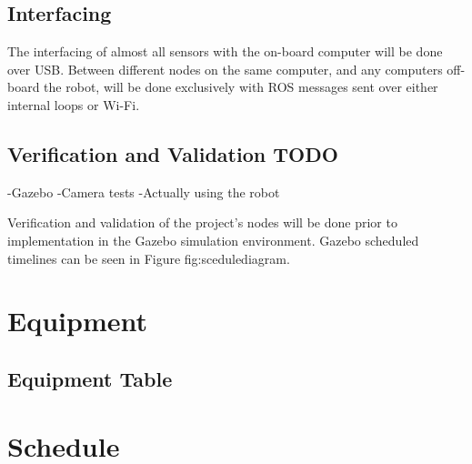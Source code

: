 \documentclass{article}
\begin{document}
	\subsection{Interfacing}
	
	The interfacing of almost all sensors with the on-board computer will be done over USB. Between different nodes on the same computer, and any computers off-board the robot, will be done exclusively with ROS messages sent over either internal loops or Wi-Fi.

	\subsection{Verification and Validation TODO}
-Gazebo
-Camera tests
-Actually using the robot

Verification and validation of the project's nodes will be done prior to implementation in the Gazebo simulation environment. Gazebo scheduled timelines can be seen in Figure {fig:scedulediagram}. 


\section{Equipment}

	\subsection{Equipment Table}
	


\section{Schedule}
\end{document}

